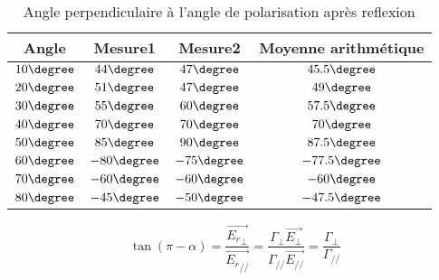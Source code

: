\documentclass[11pt,a4paper]{report}
\author{Groupe 1246}
\begin{document}
\begin{table}[h]
\centering
\begin{tabular}{|c||c|c|c|}
\hline
Angle & Mesure1 & Mesure2 & Moyenne arithmétique\\
\hline
$10 \degree$ & $44 \degree$ & $47 \degree$ & $45.5 \degree$ \\
\hline
$20 \degree$ & $51 \degree$ & $47 \degree$ & $49 \degree$ \\
\hline
$30 \degree$ & $55 \degree$ & $60 \degree$ & $57.5 \degree$ \\
\hline
$40 \degree$ & $70 \degree$ & $70 \degree$ & $70 \degree$ \\
\hline
$50 \degree$ & $85 \degree$ & $90 \degree$ & $87.5 \degree$ \\
\hline
$60 \degree$ & $-80 \degree$ & $-75 \degree$ & $-77.5 \degree$ \\
\hline
$70 \degree$ & $-60 \degree$ & $-60 \degree$ & $-60 \degree$ \\
\hline
$80 \degree$ & $-45 \degree$ & $-50 \degree$ & $-47.5 \degree$ \\

\hline
\end{tabular}
\caption{Angle perpendiculaire à l'angle de polarisation après reflexion}
\label{tab:tvarie}
\end{table}

$$\tan(\pi - \alpha) = \displaystyle \dfrac{\overrightarrow{{E_r}_\perp}}{\overrightarrow{{E_r}_{\slash\slash}}} = \displaystyle \dfrac{\Gamma_\perp \overrightarrow{E_\perp}}{\Gamma_{\slash\slash} \overrightarrow{E_{\slash\slash}}} = \displaystyle \dfrac{\Gamma_\perp}{\Gamma_{\slash\slash}}$$
\end{document}
